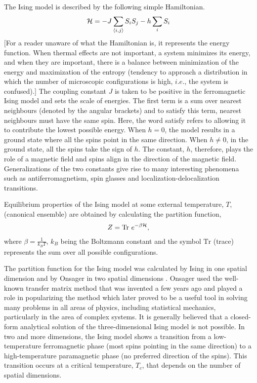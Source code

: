 \documentclass[a4paper,12pt]{article}
\begin{document}
The Ising model is described by the following simple Hamiltonian.
\begin{eqnarray}
  {\cal H}=-J\sum_{\langle i,j\rangle}S_iS_j-h\sum_iS_i
  \label{isingHam}
\end{eqnarray}
[For a reader unaware of what the Hamiltonian is,
it represents the energy function. When thermal effects are not important, a system minimizes
its energy, and when they are important, there is a balance between minimization of the
energy and maximization of the entropy (tendency to approach a distribution in which the number
of microscopic configurations is high, $i.e.$, the system is confused).]
The coupling constant $J$ is taken to be positive in the ferromagnetic Ising model and
sets the scale of energies.
The first term is a sum over nearest neighbours
(denoted by the angular brackets) and to satisfy this term,
nearest neighbours must have the same spin.
Here, the word satisfy refers to allowing it to contribute
the lowest possible energy.
When $h=0$, the model results in a ground state where all the
spins point in the same direction.
When $h\neq0$, in the ground state, all the spins take the sign of $h$.
The constant, $h$, therefore, plays the role of a magnetic field and spins align in the direction
of the magnetic field.
Generalizations of the two constants give rise to many interesting phenomena
such as antiferromagnetism, spin glasses and localization-delocalization transitions.

Equilibrium properties of the Ising model at some external temperature, $T$,
(canonical ensemble)
are obtained by calculating the partition function,
\begin{eqnarray}
  Z=\mbox{Tr}~e^{-\beta{\cal H}},
\end{eqnarray}
where $\beta=\frac{1}{k_BT}$, $k_B$ being the Boltzmann constant
and the symbol $\mbox{Tr}$ (trace) represents the sum over all possible
configurations.

The partition function for the Ising model was calculated by Ising in
one spatial dimension \cite{ising25} and by Onsager in two spatial
dimensions \cite{onsager44}.
Onsager used the well-known transfer matrix method
that was invented a few years ago and played a role in popularizing the method
which later proved to be a useful tool in solving many problems in
all areas of physics, including statistical mechanics,
particularly in the area of complex systems.
It is generally believed that a closed-form analytical solution
of the three-dimensional Ising model is not possible.
In two and more dimensions, the Ising model shows a transition
from a low-temperature ferromagnetic phase (most spins pointing in the same direction)
to a high-temperature paramagnetic phase (no preferred direction of the spins).
This transition occurs at a critical temperature, $T_c$, that depends on the
number of spatial dimensions.
\end{document}
